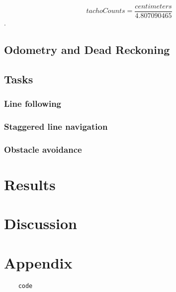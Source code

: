 \documentclass[12pt]{article}
\begin{document}
\[tachoCounts=\frac{centimeters}{4.807090465}\].

\subsection{Odometry and Dead Reckoning}

\subsection{Tasks}

\subsubsection{Line following}

\subsubsection{Staggered line navigation}

\subsubsection{Obstacle avoidance}

\section{Results}


\section{Discussion}


\section*{Appendix}

\begin{verbatim}
	code
\end{verbatim}
\end{document}
